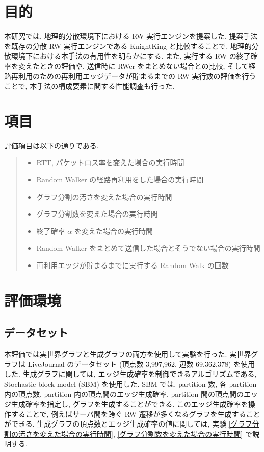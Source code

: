 \section{目的}
本研究では, 地理的分散環境下における RW 実行エンジンを提案した. 提案手法を既存の分散 RW 実行エンジンである KnightKing \cite{10.1145/3341301.3359634} と比較することで, 地理的分散環境下における本手法の有用性を明らかにする. また, 実行する RW の終了確率を変えたときの評価や, 送信時に RWer をまとめない場合との比較, そして経路再利用のための再利用エッジデータが貯まるまでの RW 実行数の評価を行うことで, 本手法の構成要素に関する性能調査も行った. 

\section{項目}

評価項目は以下の通りである. 
\begin{quote}
    \begin{itemize}
     \item RTT, パケットロス率を変えた場合の実行時間
     \item Random Walker の経路再利用をした場合の実行時間
     \item グラフ分割の汚さを変えた場合の実行時間
     \item グラフ分割数を変えた場合の実行時間
     \item 終了確率 $\alpha$ を変えた場合の実行時間
     \item Random Walker をまとめて送信した場合とそうでない場合の実行時間
     \item 再利用エッジが貯まるまでに実行する Random Walk の回数
    \end{itemize}
\end{quote}

\section{評価環境}

\subsection{データセット}

本評価では実世界グラフと生成グラフの両方を使用して実験を行った. 実世界グラフは LiveJournal のデータセット\cite{snapnets} (頂点数 3,997,962, 辺数 69,362,378) を使用した. 生成グラフに関しては, エッジ生成確率を制御できるアルゴリズムである, Stochastic block model (SBM) \cite{SBM} を使用した. SBM では, partition 数, 各 partition 内の頂点数, partition 内の頂点間のエッジ生成確率, partition 間の頂点間のエッジ生成確率を指定し, グラフを生成することができる. このエッジ生成確率を操作することで, 例えばサーバ間を跨ぐ RW 遷移が多くなるグラフを生成することができる. 生成グラフの頂点数とエッジ生成確率の値に関しては, 実験 \ref{グラフ分割の汚さを変えた場合の実行時間}, \ref{グラフ分割数を変えた場合の実行時間} で説明する. 

